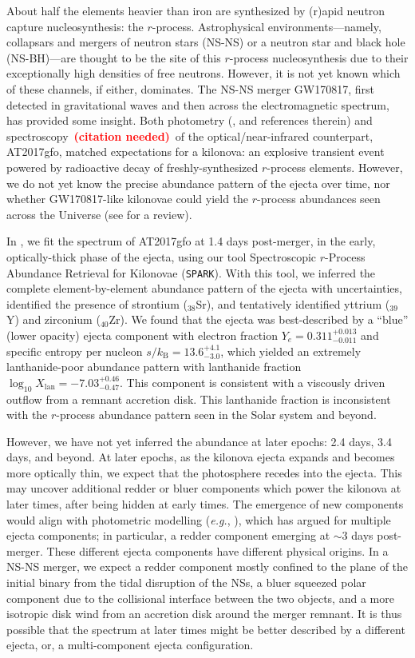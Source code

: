 \documentclass[twocolumn, twocolappendix]{aastex63}
\def\SPARK{\texttt{SPARK}}
\def\citneeded{\textcolor{red}{\textbf{(citation needed)}}}
\def\eg{{\it e.g.}}
\begin{document}
About half the elements heavier than iron are synthesized by (r)apid neutron capture nucleosynthesis: the $r$-process. Astrophysical environments---namely, collapsars and mergers of neutron stars (NS-NS) or a neutron star and black hole (NS-BH)---are thought to be the site of this $r$-process nucleosynthesis due to their exceptionally high densities of free neutrons. However, it is not yet known which of these channels, if either, dominates. The NS-NS merger GW170817, first detected in gravitational waves and then across the electromagnetic spectrum, has provided some insight. Both photometry (\citealt{villar17}, and references therein) and spectroscopy~\citneeded~of the optical/near-infrared counterpart, AT2017gfo, matched expectations for a kilonova: an explosive transient event powered by radioactive decay of freshly-synthesized $r$-process elements. However, we do not yet know the precise abundance pattern of the ejecta over time, nor whether GW170817-like kilonovae could yield the $r$-process abundances seen across the Universe (see \citealt{cowan21} for a review). 

In \cite{vieira23}, we fit the spectrum of AT2017gfo at 1.4 days post-merger, in the early, optically-thick phase of the ejecta, using our tool Spectroscopic $r$-Process Abundance Retrieval for Kilonovae (\SPARK). With this tool, we inferred the complete element-by-element abundance pattern of the ejecta with uncertainties, identified the presence of strontium (${}_{38}$Sr), and tentatively identified yttrium (${}_{39}$Y) and zirconium (${}_{40}$Zr). We found that the ejecta was best-described by a ``blue'' (lower opacity) ejecta component with electron fraction $Y_e = 0.311^{+0.013}_{-0.011}$ and specific entropy per nucleon $s / k_{\mathrm{B}} = 13.6^{+4.1}_{-3.0}$, which yielded an extremely lanthanide-poor abundance pattern with lanthanide fraction $\log_{10 }X_{\mathrm{lan}} = {-7.03}^{+0.46}_{-0.47}$. This component is consistent with a viscously driven outflow from a remnant accretion disk. This lanthanide fraction is inconsistent with the $r$-process abundance pattern seen in the Solar system and beyond.

However, we have not yet inferred the abundance at later epochs: 2.4 days, 3.4 days, and beyond. At later epochs, as the kilonova ejecta expands and becomes more optically thin, we expect that the photosphere recedes into the ejecta. This may uncover additional redder or bluer components which power the kilonova at later times, after being hidden at early times. The emergence of new components would align with photometric modelling (\eg, \citealt{villar17}), which has argued for multiple ejecta components; in particular, a redder component emerging at $\sim 3$ days post-merger. These different ejecta components have different physical origins. In a NS-NS merger, we expect a redder component mostly confined to the plane of the initial binary from the tidal disruption of the NSs, a bluer squeezed polar component due to the collisional interface between the two objects, and a more isotropic disk wind from an accretion disk around the merger remnant. It is thus possible that the spectrum at later times might be better described by a different ejecta, or, a multi-component ejecta configuration. 
\end{document}
